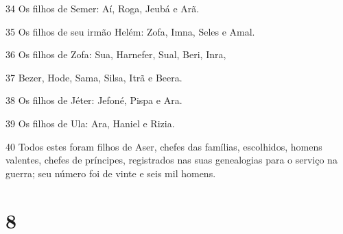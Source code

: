 \par 34 Os filhos de Semer: Aí, Roga, Jeubá e Arã.
\par 35 Os filhos de seu irmão Helém: Zofa, Imna, Seles e Amal.
\par 36 Os filhos de Zofa: Sua, Harnefer, Sual, Beri, Inra,
\par 37 Bezer, Hode, Sama, Silsa, Itrã e Beera.
\par 38 Os filhos de Jéter: Jefoné, Pispa e Ara.
\par 39 Os filhos de Ula: Ara, Haniel e Rizia.
\par 40 Todos estes foram filhos de Aser, chefes das famílias, escolhidos, homens valentes, chefes de príncipes, registrados nas suas genealogias para o serviço na guerra; seu número foi de vinte e seis mil homens.

\chapter{8}


